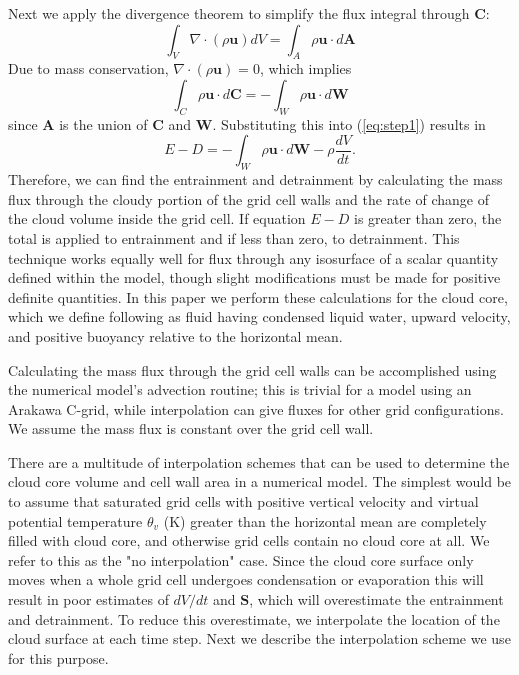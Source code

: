 \documentclass[12pt]{article}
\begin{document}
Next we apply the divergence theorem to simplify the flux integral through 
$\mathbf{C}$:
\begin{equation}
\label{eq:divergence} 
\int_{V} \nabla \cdot (\rho \mathbf{u}) dV = 
  \int_{A} \rho \mathbf{u}\cdot d\mathbf{A}
\end{equation}
Due to mass conservation, $\nabla \cdot (\rho \mathbf{u}) = 0$, which implies
\begin{equation}
\label{eq:divergence3} 
  \int_{C} \rho \mathbf{u}\cdot d\mathbf{C} = 
    - \int_{W} \rho \mathbf{u}\cdot d\mathbf{W}
\end{equation}
since $\mathbf{A}$ is the union of $\mathbf{C}$ and $\mathbf{W}$.  Substituting
this into (\ref{eq:step1}) results in
\begin{equation}
\label{eq:entrainment_detrainment} 
E - D = - \int_W \rho \mathbf{u} \cdot d\mathbf{W} - \rho \frac{dV}{dt}.
\end{equation}
Therefore, we can find the entrainment and detrainment by calculating the mass
flux through the cloudy portion of the grid cell walls and the rate of change
of the cloud volume inside the grid cell.  If equation $E - D$ is greater than 
zero, the total is applied to entrainment and if less than zero, to 
detrainment.  This technique works equally well for flux through any isosurface 
of a scalar quantity defined within the model, though slight modifications must
be made for positive definite quantities.  In this paper we perform these 
calculations for the cloud core, which we define following \cite{Siebesma1995} 
as fluid having condensed liquid water, upward velocity, and positive buoyancy 
relative to the horizontal mean.  

Calculating the mass flux through the grid cell walls can be accomplished using 
the numerical model's advection routine; this is trivial for a model using an 
Arakawa C-grid, while interpolation can give fluxes for other grid 
configurations.  We assume the mass flux is constant over the grid cell wall.  

There are a multitude of interpolation schemes that can be used to determine 
the cloud core volume and cell wall area in a numerical model.  The simplest 
would be to assume that saturated grid cells with positive vertical velocity 
and virtual potential temperature $\theta_v$ (K) greater than the horizontal 
mean are completely filled with cloud core, and otherwise grid cells contain 
no cloud core at all.  We refer to this as the "no interpolation" case.  Since
the cloud core surface only moves when a whole grid cell undergoes 
condensation or evaporation this will result in poor estimates of $dV/dt$ and
$\mathbf{S}$, which will overestimate the entrainment and detrainment.  To 
reduce this overestimate, we interpolate the location of the cloud surface at 
each time step.  Next we describe the interpolation scheme we use for this 
purpose.
\end{document}

